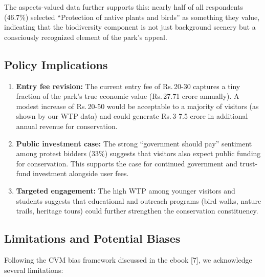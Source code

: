 \documentclass[12pt, a4paper]{article}
\newcommand{\rupee}{\textrm{Rs.}\,}
\begin{document}
The aspects-valued data further supports this: nearly half of all respondents (46.7\%) selected ``Protection of native plants and birds'' as something they value, indicating that the biodiversity component is not just background scenery but a consciously recognized element of the park's appeal.

\subsection{Policy Implications}

\begin{enumerate}
    \item \textbf{Entry fee revision:} The current entry fee of \rupee 20-30 captures a tiny fraction of the park's true economic value (\rupee 27.71 crore annually). A modest increase of \rupee 20-50 would be acceptable to a majority of visitors (as shown by our WTP data) and could generate \rupee 3-7.5 crore in additional annual revenue for conservation.

    \item \textbf{Public investment case:} The strong ``government should pay'' sentiment among protest bidders (33\%) suggests that visitors also expect public funding for conservation. This supports the case for continued government and trust-fund investment alongside user fees.

    \item \textbf{Targeted engagement:} The high WTP among younger visitors and students suggests that educational and outreach programs (bird walks, nature trails, heritage tours) could further strengthen the conservation constituency.
\end{enumerate}

\subsection{Limitations and Potential Biases}

Following the CVM bias framework discussed in the ebook [7], we acknowledge several limitations:
\end{document}
